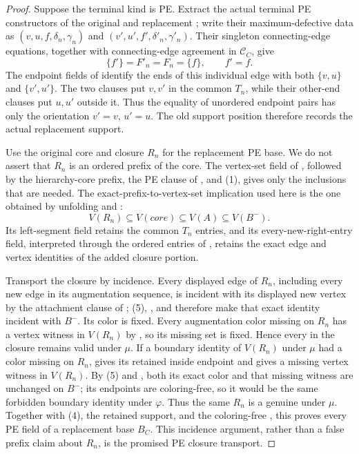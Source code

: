 \begin{proof}
Suppose the terminal kind is PE.  Extract the actual terminal PE
constructors of the original and replacement
; write their maximum-defective data as
$(v,u,f,\delta_n,\gamma_n)$ and
$(v',u',f',\delta'_n,\gamma'_n)$.  Their singleton connecting-edge
equations, together with connecting-edge agreement in $\mathcal C_C$,
give
\[
                         \{f'\}=F'_n=F_n=\{f\},\qquad f'=f.    \tag{4}
\]
The endpoint fields of  identify the
ends of this individual edge with both $\{v,u\}$ and $\{v',u'\}$.  The
two  clauses put $v,v'$ in the common $T_n$,
while their other-end clauses put $u,u'$ outside it.  Thus the equality of
unordered endpoint pairs has only the orientation $v'=v$, $u'=u$.  The
old support position therefore records the actual replacement support.

Use the original core and closure $R_n$ for the replacement PE base.  We
do not assert that $R_n$ is an ordered prefix of the core.
The vertex-set field of , followed by the
hierarchy-core prefix, the PE clause of
, and (1), gives only the inclusions that
are needed.  The exact-prefix-to-vertex-set implication used here is the
one obtained by unfolding  and
:
\[
 V(R_n)\subseteq V(\mathit{core})\subseteq V(A)\subseteq V(B^-).\tag{5}
\]
Its left-segment field retains the common $T_n$ entries, and its
every-new-right-entry field, interpreted through the ordered entries of
, retains the exact edge and vertex identities of
the added closure portion.

Transport the closure by incidence.  Every displayed edge of $R_n$,
including every new edge in its augmentation sequence, is incident with
its displayed new vertex by the attachment clause of
; (5), , and
 therefore make that exact identity incident
with $B^-$.  Its color is fixed.  Every augmentation color missing on
$R_n$ has a vertex witness in $V(R_n)$ by
, so its missing set is fixed.  Hence every
 in the closure remains valid under $\mu$.
If a boundary identity of $V(R_n)$ under $\mu$ had a color missing on
$R_n$,  gives its retained inside endpoint and
 gives a missing vertex witness in $V(R_n)$.
By (5) and , both its exact color and that
missing witness are unchanged on $B^-$; its endpoints are coloring-free,
so it would be the same forbidden boundary identity under $\varphi$.
Thus the same $R_n$ is a genuine  under $\mu$.
Together with (4), the retained support, and the coloring-free
, this proves every PE field of a replacement
base $B_C$.  This incidence argument, rather than a false prefix claim
about $R_n$, is the promised PE closure transport.


\end{proof}
